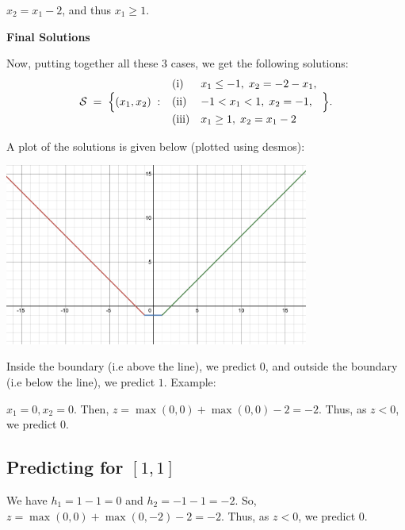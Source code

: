 \documentclass[a4paper]{article}
\begin{document}
$x_2 = x_1 - 2$, and thus $x_1 \ge 1$. 

\textbf{Final Solutions}

Now, putting together all these 3 cases, we get the following solutions:
\[
\mathcal{S} \;=\;
\Bigl\{
(x_1,x_2)\;:\;
\begin{array}{ll}
\text{(i)} & x_1 \le -1,\; x_2 = -2 - x_1,\\[4pt]
\text{(ii)} & -1 < x_1 < 1,\; x_2 = -1,\\[4pt]
\text{(iii)}& x_1 \ge 1,\; x_2 = x_1 - 2
\end{array}
\Bigr\}.
\]
\newpage

A plot of the solutions is given below (plotted using desmos):

\begin{center}
    \includegraphics[width=0.75\textwidth]{figures/solutions_boundary.png}
\end{center}

Inside the boundary (i.e above the line), we predict $0$, and outside the boundary (i.e below the line), we predict $1$. Example:

$x_1 = 0, x_2 = 0$. Then, $z = \max(0, 0) + \max(0, 0) - 2 = -2$. Thus, as $z < 0$, we predict $0$.

\subsection{Predicting for $\left[1, 1\right]$}

We have $h_1 = 1 - 1 = 0$ and $h_2 = -1 - 1 = -2$. So, $z = \max(0, 0) + \max(0, -2) - 2 = -2$. Thus, as $z < 0$, we predict $0$.
\end{document}

